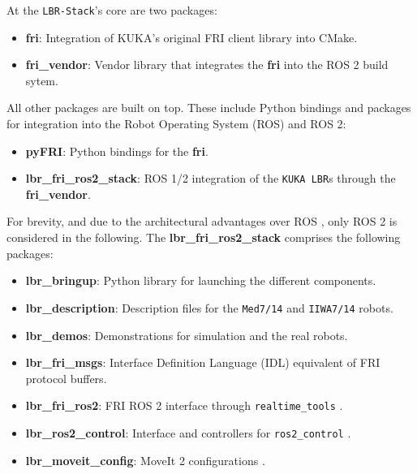 At the \texttt{LBR-Stack}'s core are two packages:

\begin{itemize}
\item
  \textbf{fri}: Integration of KUKA's original FRI client library into
  CMake.
\item
  \textbf{fri\_vendor}: Vendor library that integrates the \textbf{fri}
  into the ROS 2 build sytem.
\end{itemize}

All other packages are built on top. These include Python bindings and
packages for integration into the Robot Operating System (ROS) and ROS
2:

\begin{itemize}
\item
  \textbf{pyFRI}: Python bindings for the \textbf{fri}.
\item
  \textbf{lbr\_fri\_ros2\_stack}: ROS 1/2 integration of the
  \texttt{KUKA\ LBR}s through the \textbf{fri\_vendor}.
\end{itemize}

For brevity, and due to the architectural advantages over ROS
\cite{ref-ros2}, only ROS 2 is
considered in the following. The \textbf{lbr\_fri\_ros2\_stack}
comprises the following packages:

\begin{itemize}
\item
  \textbf{lbr\_bringup}: Python library for launching the different
  components.
\item
  \textbf{lbr\_description}: Description files for the \texttt{Med7/14}
  and \texttt{IIWA7/14} robots.
\item
  \textbf{lbr\_demos}: Demonstrations for simulation and the real
  robots.
\item
  \textbf{lbr\_fri\_msgs}: Interface Definition Language (IDL)
  equivalent of FRI protocol buffers.
\item
  \textbf{lbr\_fri\_ros2}: FRI ROS 2 interface through
  \texttt{realtime\_tools} \cite{ref-ros_control}.
\item
  \textbf{lbr\_ros2\_control}: Interface and controllers for
  \texttt{ros2\_control} \cite{ref-ros2_control}.
\item
  \textbf{lbr\_moveit\_config}: MoveIt 2 configurations
  \cite{ref-moveit}.
\end{itemize}


